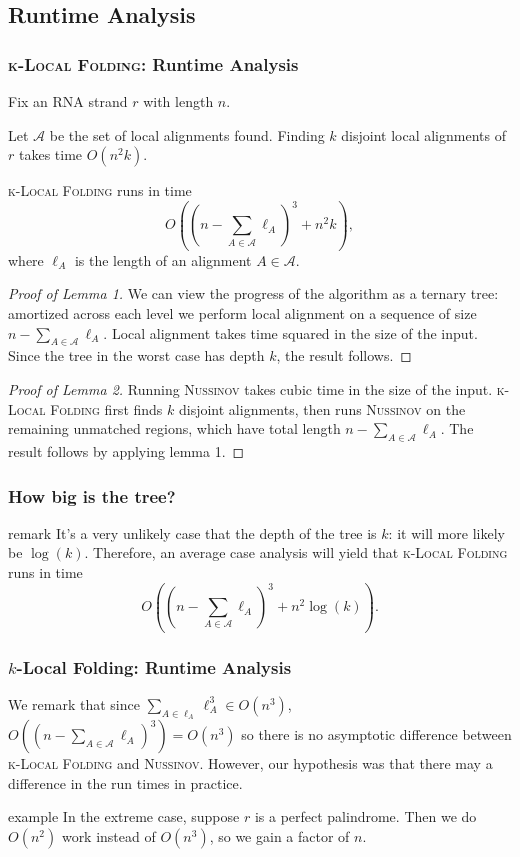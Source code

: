 \documentclass{beamer}
\newcommand{\klf}{\textsc{k-Local Folding}\xspace}
\newcommand{\rf}{\textsc{Nussinov}\xspace}
\newcommand{\al}{\mathscr{A}}
\begin{document}
\begin{frame}
\subsection{Runtime Analysis}
\frametitle{\klf: Runtime Analysis}
Fix an RNA strand $r$ with length $n$. 
\begin{lemma}[1]
Let $\al$ be the set of local alignments found. Finding $k$ disjoint local alignments of $r$ takes time $O(n^2 k)$. 
\end{lemma}
\begin{lemma}[2]
\klf runs in time
\[O\left(\left(n-\sum_{A\in\al}\ell_A\right)^3+n^2k\right),\] where $\ell_A$ is the length of an alignment $A\in\al$. 
\end{lemma}
\end{frame}

\begin{frame}
\begin{proof}[Proof of Lemma 1]
We can view the progress of the algorithm as a ternary tree: amortized across each level we perform local alignment on a sequence of size $n-\sum_{A\in\al}\ell_A$. Local alignment takes time squared in the size of the input. Since the tree in the worst case has depth $k$, the result follows. 
\end{proof}
\begin{proof}[Proof of Lemma 2]
Running \rf takes cubic time in the size of the input. \klf first finds $k$ disjoint alignments, then runs \rf on the remaining unmatched regions, which have total length $n-\sum_{A\in\al}\ell_A$.   The result follows by applying lemma 1. 
\end{proof}
\end{frame}

\begin{frame}
\frametitle{How big is the tree?}
\begin{block}{remark}
It's a very unlikely case that the depth of the tree is $k$: it will more likely be $\log(k)$. Therefore, an average case analysis will yield that \klf runs in time 
\[O\left(\left(n-\sum_{A\in\al}\ell_A\right)^3+n^2\log (k)\right).\]
\end{block}
\end{frame}

\begin{frame}
\frametitle{$k$-Local Folding: Runtime Analysis}
We remark that since $\sum_{A\in\ell_A}\ell_A^3\in O(n^3)$, $O((n-\sum_{A\in\al}\ell_A)^3)=O(n^3)$ so there is no asymptotic difference between \klf and \rf.
However, our hypothesis was that there may a difference in the run times in practice.  

\begin{block}{example}
In the extreme case, suppose $r$ is a perfect palindrome. Then we do $O(n^2)$ work instead of $O(n^3)$, so we gain a factor of $n$. 
\end{block}
\end{frame}
\end{document}
